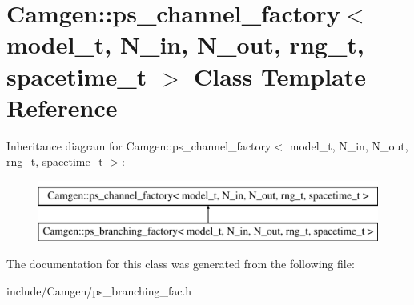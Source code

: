 \hypertarget{a00449}{}\section{Camgen\+:\+:ps\+\_\+channel\+\_\+factory$<$ model\+\_\+t, N\+\_\+in, N\+\_\+out, rng\+\_\+t, spacetime\+\_\+t $>$ Class Template Reference}
\label{a00449}
Inheritance diagram for Camgen\+:\+:ps\+\_\+channel\+\_\+factory$<$ model\+\_\+t, N\+\_\+in, N\+\_\+out, rng\+\_\+t, spacetime\+\_\+t $>$\+:\begin{figure}[H]
\begin{center}
\leavevmode
\includegraphics[height=2.000000cm]{a00449}
\end{center}
\end{figure}


The documentation for this class was generated from the following file\+:\begin{DoxyCompactItemize}
\item 
include/\+Camgen/ps\+\_\+branching\+\_\+fac.\+h\end{DoxyCompactItemize}
